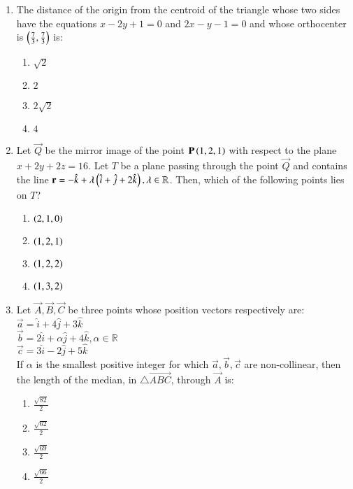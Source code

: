 \documentclass[journal,12pt,onecolumn]{IEEEtran}
\theoremstyle{remark}
\begin{document}
\begin{enumerate}[start=1]
\begin{enumerate}
		\end{enumerate}
	\item The distance of the origin from the centroid of the triangle whose two sides have the equations $x-2y+1=0$ and $2x-y-1=0$ and whose orthocenter is $\left(\frac{7}{3},\frac{7}{3}\right)$ is:
		\begin{enumerate}
			\item $\sqrt{2}$\\
			\item $2$\\
			\item $2\sqrt{2}$\\
			\item $4$\\
		\end{enumerate}
	\item Let $\vec{Q}$ be the mirror image of the point $\mathbf{P}\left(1, 2, 1\right)$ with respect to the plane $x+2y+2z=16$. Let $T$ be a plane passing through the point $\vec{Q}$ and contains the line $\mathbf{r}=-\hat{k}+\lambda\left(\hat{i}+\hat{j}+2\hat{k}\right),\lambda\in\mathbb{R}$. Then, which of the following points lies on $T$?
		\begin{enumerate}
			\item $\left(2,1,0\right)$\\
			\item $\left(1,2,1\right)$\\
			\item $\left(1,2,2\right)$\\
			\item $\left(1,3,2\right)$\\
		\end{enumerate}
	\item Let $\vec{A},\vec{B},\vec{C}$ be three points whose position vectors respectively are:\\
		$\vec{a}=\hat{i}+4\hat{j}+3\hat{k}$\\
		$\vec{b}=2\hat{i}+\alpha\hat{j}+4\hat{k},\alpha\in\mathbb{R}$\\
		$\vec{c}=3\hat{i}-2\hat{j}+5\hat{k}$\\
		If $\alpha$ is the smallest positive integer for which $\vec{a},\vec{b},\vec{c}$ are non-collinear, then the length of the median, in $\triangle\vec{ABC}$, through $\vec{A}$ is:
		\begin{enumerate}
			\item $\frac{\sqrt{82}}{2}$\\
			\item $\frac{\sqrt{62}}{2}$\\
			\item $\frac{\sqrt{69}}{2}$\\
			\item $\frac{\sqrt{66}}{2}$\\
		\end{enumerate}



\end{enumerate}
\end{document}
